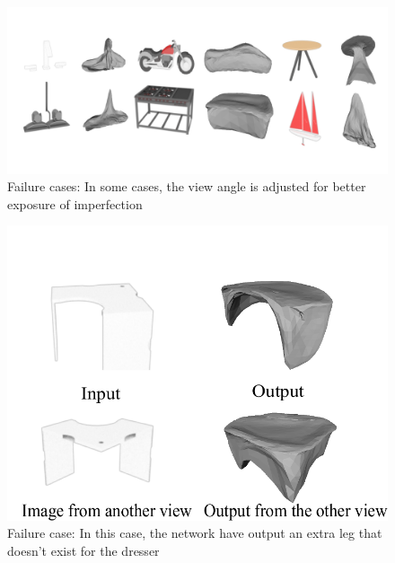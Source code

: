 \begin{figure}[htbp]
	\centering
	\includegraphics[width=\linewidth]{img/fail/fail1}
	\caption{Failure cases: In some cases, the view angle is adjusted for better exposure of imperfection}
	\label{fig:fail1}
\end{figure}
\begin{figure}[htbp]
	\centering
	\includegraphics[width=\linewidth]{img/fail/fail2}
	\caption{Failure case: In this case, the network have output an extra leg that doesn't exist for the dresser}
	\label{fig:fail2}
\end{figure}


